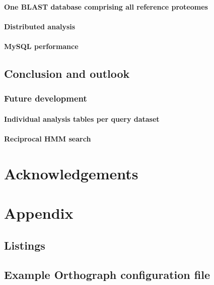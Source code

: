 \documentclass[a4paper,12pt]{scrreprt}
\newcommand{\pname}{Orthograph\xspace}
\begin{document}
		\subsubsection{One BLAST database comprising all reference proteomes}
			
		\subsubsection{Distributed analysis}
			
		\subsubsection{MySQL performance}
			
	\section{Conclusion and outlook}
		
		\subsection{Future development}
			
			\subsubsection{Individual analysis tables per query dataset}
				
			\subsubsection{Reciprocal HMM search}
				

\clearpage

%
%
{}
\chapter*{Acknowledgements}
	
	\clearpage

%
%
{}
\footnotesize


\normalsize
\clearpage

%
%
\appendix
\chapter{Appendix}
	\section{Listings}
		
	\clearpage
	\section{Example \pname configuration file}
		
	\clearpage
\end{document}
